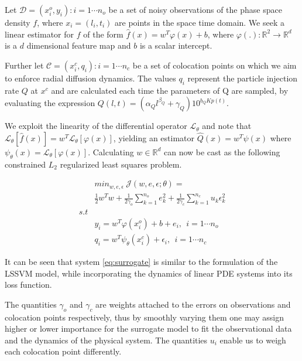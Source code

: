 Let $\mathcal{D}={(x^{o}_{i}, y_{i}): i = 1 \cdots n_{o}}$ be a set of
noisy observations of the phase space density $f$, where $x_{i} =
(l_{i}, t_{i})$ are points in the space time domain. We seek a linear
estimator for $f$ of the form $\hat{f}(x) = w^{T}\varphi(x) + b$,
where $\varphi(.): \mathbb{R}^{2} \rightarrow \mathbb{R}^{d}$ is a $d$
dimensional feature map and $b$ is a scalar intercept.

Further let $\mathcal{C} ={(x^{c}_{i}, q_{i}): i = 1 \cdots n_{c}}$ be 
a set of colocation points on which we aim to enforce radial diffusion
dynamics. The values $q_{i}$ represent the particle injection rate $Q$ at $x^c$ and 
are calculated each time the parameters of Q are sampled, by evaluating the expression 
$Q(l,t) = (\alpha_{Q}l^{\beta_{Q}} + \gamma_{Q})10^{b_{Q}Kp(t)}$.

We exploit the linearity of the differential operator
$\mathcal{L}_{\theta}$ and note that $\mathcal{L}_{\theta} [\hat{f}(x)]
= w^{T} \mathcal{L}_{\theta}[\varphi(x)]$, yielding an estimator
$\hat{Q}(x) = w^{T}\psi(x)$ where $\psi_{\theta}(x) =
\mathcal{L}_{\theta}[\varphi(x)]$. Calculating $w \in \mathbb{R}^d$
can now be cast as the following constrained $L_2$ regularized 
least squares problem.

\begin{align}\label{eq:surrogate}
   & min_{w,e,\epsilon} \ \mathcal{J}(w,e,\epsilon;\theta) = \\
   & \frac{1}{2} w^{T}w + \frac{1}{2\gamma_{o}} \sum_{k = 1}^{n_{o}}{e^{2}_{k}} + \frac{1}{2\gamma_{c}} \sum_{k = 1}^{n_{c}}{u_{k} \epsilon^{2}_{k}} \\
  s.t &\nonumber \\
  & y_{i}  = w^{T}\varphi(x^{o}_{i}) + b + e_{i}, \ \ i = 1 \cdots n_{o} \\
  & q_{i} = w^{T}\psi_{\theta}(x^{c}_{i}) + \epsilon_{i}, \ \ i = 1 \cdots n_{c}
\end{align}

It can be seen that system \ref{eq:surrogate} is similar to the
formulation of the LSSVM model, while incorporating the dynamics of
linear PDE systems into its loss function. 

The quantities $\gamma_{o}$ and $\gamma_{c}$ are weights attached to
the errors on observations and colocation points respectively, thus
by smoothly varying them one may assign higher or lower importance for
the surrogate model to fit the observational data and the dynamics of
the physical system. The quantities $u_i$ enable us to weigh each colocation
point differently.

